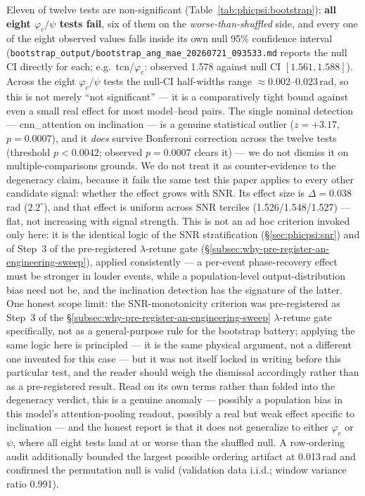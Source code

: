 \documentclass[11pt]{article}
\begin{document}
Eleven of twelve tests are non-significant (Table~\ref{tab:phicpsi:bootstrap}); \textbf{all eight $\varphi_c/\psi$ tests fail}, six of them on the \emph{worse-than-shuffled} side, and every one of the eight observed values falls inside its own null 95\% confidence interval (\texttt{bootstrap\_output/bootstrap\_ang\_mae\_20260721\_093533.md} reports the null CI directly for each; e.g.\ tcn/$\varphi_c$: observed 1.578 against null CI $[1.561, 1.588]$).
Across the eight $\varphi_c/\psi$ tests the null-CI half-widths range ${\approx}0.002$--$0.023$\,rad, so this is not merely ``not significant'' --- it is a comparatively tight bound against even a small real effect for most model--head pairs.
The single nominal detection --- cnn\_attention on inclination --- is a genuine statistical outlier ($z=+3.17$, $p=0.0007$), and it \emph{does} survive Bonferroni correction across the twelve tests (threshold $p < 0.0042$; observed $p = 0.0007$ clears it) --- we do not dismiss it on multiple-comparisons grounds.
We do not treat it as counter-evidence to the degeneracy claim, because it fails the same test this paper applies to every other candidate signal: whether the effect grows with SNR.
Its effect size is $\Delta = 0.038$\,rad ($2.2^\circ$), and that effect is uniform across SNR terciles (1.526/1.548/1.527) --- flat, not increasing with signal strength.
This is not an ad hoc criterion invoked only here: it is the identical logic of the SNR stratification (\S\ref{sec:phicpsi:snr}) and of Step~3 of the pre-registered $\lambda$-retune gate (\S\ref{subsec:why-pre-register-an-engineering-sweep}), applied consistently --- a per-event phase-recovery effect must be stronger in louder events, while a population-level output-distribution bias need not be, and the inclination detection has the signature of the latter.
One honest scope limit: the SNR-monotonicity criterion was pre-registered as Step~3 of the \S\ref{subsec:why-pre-register-an-engineering-sweep} $\lambda$-retune gate specifically, not as a general-purpose rule for the bootstrap battery; applying the same logic here is principled --- it is the same physical argument, not a different one invented for this case --- but it was not itself locked in writing before this particular test, and the reader should weigh the dismissal accordingly rather than as a pre-registered result.
Read on its own terms rather than folded into the degeneracy verdict, this is a genuine anomaly --- possibly a population bias in this model's attention-pooling readout, possibly a real but weak effect specific to inclination --- and the honest report is that it does not generalize to either $\varphi_c$ or $\psi$, where all eight tests land at or worse than the shuffled null.
A row-ordering audit additionally bounded the largest possible ordering artifact at 0.013\,rad and confirmed the permutation null is valid (validation data i.i.d.; window variance ratio 0.991).
\end{document}
